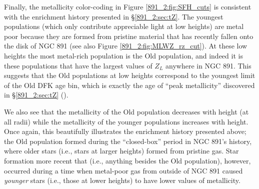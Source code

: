 

Finally, the metallicity color-coding in Figure
\ref{891_2:fig:SFH_cuts} is consistent with the enrichment history
presented in \S\ref{891_2:sec:tZ}. The youngest populations (which
only contribute appreciable light at low heights) are metal poor
because they are formed from pristine material that has recently
fallen onto the disk of NGC 891 (see also Figure
\ref{891_2:fig:MLWZ_rz_cut}). At these low heights the most metal-rich
population is the Old population, and indeed it is these populations
that have the largest values of $Z_L$ anywhere in NGC 891. This
suggests that the Old populations at low heights correspond to the
youngest limit of the Old DFK age bin, which is exactly the age of
``peak metallicity'' discovered in \S\ref{891_2:sec:tZ} ().

We also see that the metallicity of the Old population decreases with
height (at all radii) while the metallicity of the younger populations
increases with height. Once again, this beautifully illustrates the
enrichment history presented above; the Old population formed during
the ``closed-box'' period in NGC 891's history, where older stars
(i.e., stars at larger heights) formed from pristine gas. Star
formation more recent that  (i.e., anything besides the
Old population), however, occurred during a time when metal-poor gas
from outside of NGC 891 caused \emph{younger} stars (i.e., those at
lower heights) to have lower values of metallicity.


